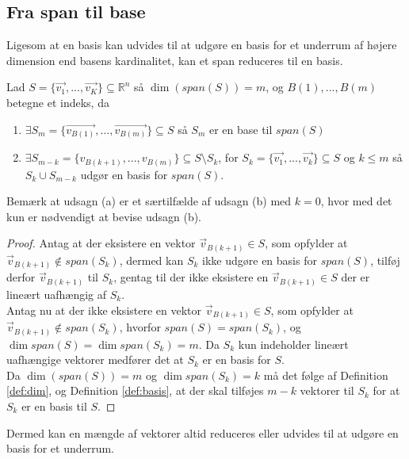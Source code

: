 \subsection{Fra span til base}
Ligesom at en basis kan udvides til at udgøre en basis for et underrum af højere dimension end basens kardinalitet, kan et span reduceres til en basis.
\begin{stn}
Lad $S=\{\vec{v_1},..., \vec{v_K}\} \subseteq \mathds{R}^n$ så $\dim(span(S)) = m$, og $B(1),...,B(m)$ betegne et indeks, da
\begin{enumerate}[label=\alph*]
\item $\exists S_m =\{\vec{v_{B(1)}},...,\vec{v_{B(m)}}\}\subseteq S$ så $S_m$ er en base til $span (S)$
\item $\exists S_{m-k} = \{v_{B(k+1)},...,v_{B(m)}\} \subseteq S\setminus S_k$, for $S_k = \{\vec{v_1},..., \vec{v_k}\} \subseteq S$ og $k \leq m$ så $S_k \cup S_{m-k}$ udgør en basis for $span(S)$.
\end{enumerate} 
\label{stn:spantilbasis}
\end{stn}
Bemærk at udsagn (a) er et særtilfælde af udsagn (b) med $k=0$, hvor med det kun er nødvendigt at bevise udsagn (b).
\begin{proof}
Antag at der eksistere en vektor $\vec{v}_{B(k+1)} \in S$, som opfylder at $\vec{v}_{B(k+1)} \notin span(S_k)$, dermed kan $S_k$ ikke udgøre en basis for $span(S)$, tilføj derfor $\vec{v}_{B(k+1)}$ til $S_k$, gentag til der ikke eksistere en $\vec{v}_{B(k+1)} \in S$ der er lineært uafhængig af $S_k$. 
\\Antag nu at der ikke eksistere en vektor $\vec{v}_{B(k+1)} \in S$, som opfylder at $\vec{v}_{B(k+1)} \notin span(S_k)$, hvorfor $span(S) = span(S_k)$, og $\dim{span(S)}=\dim{span(S_k)}= m$.
Da $S_k$ kun indeholder lineært uafhængige vektorer medfører det at $S_k$ er en basis for $S$.
\\Da $\dim(span(S)) = m$ og $\dim{span(S_k)}=k$ må det følge af Definition \ref{def:dim}, og Definition \ref{def:basis}, at der skal tilføjes $m-k$ vektorer til $S_k$ for at $S_k$ er en basis til $S$.
\end{proof} 
Dermed kan en mængde af vektorer altid reduceres eller udvides til at udgøre en basis for et underrum.


